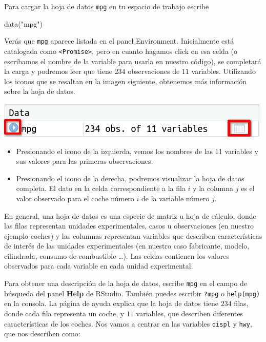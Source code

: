 \documentclass[
  title=normal,
  notoc,
  bib=normal]{mnye}
\newenvironment{Shaded}{\begin{snugshade}}{\end{snugshade}}
\newcommand{\FunctionTok}[1]{\textcolor[rgb]{0.00,0.00,0.00}{#1}}
\newcommand{\NormalTok}[1]{#1}
\newcommand{\StringTok}[1]{\textcolor[rgb]{0.31,0.60,0.02}{#1}}
\begin{document}
Para cargar la hoja de datos \texttt{mpg} en tu espacio de trabajo escribe

\begin{Shaded}
\begin{Highlighting}[]
\FunctionTok{data}\NormalTok{(}\StringTok{"mpg"}\NormalTok{)}
\end{Highlighting}
\end{Shaded}

Verás que \texttt{mpg} aparece listada en el panel Environment. Inicialmente está catalogada como \texttt{\textless{}Promise\textgreater{}}, pero en cuanto hagamos click en esa celda (o escribamos el nombre de la variable para usarla en nuestro código), se completará la carga y podremos leer que tiene \(234\) observaciones de \(11\) variables. Utilizando los iconos que se resaltan en la imagen siguiente, obtenemos más información sobre la hoja de datos.

\begin{center}\includegraphics[width=0.6\linewidth]{images/df} \end{center}

\begin{itemize}
\item
  Presionando el icono de la izquierda, vemos los nombres de las 11 variables y sus valores para las primeras observaciones.
\item
  Presionando el icono de la derecha, podremos visualizar la hoja de datos completa. El dato en la celda correspondiente a la fila \(i\) y la columna \(j\) es el valor observado para el coche número \(i\) de la variable número \(j\).
\end{itemize}

En general, una hoja de datos es una especie de matriz u hoja de cálculo, donde las filas representan unidades experimentales, casos u observaciones (en nuestro ejemplo coches) y las columnas representan variables que describen características de interés de las unidades experimentales (en nuestro caso fabricante, modelo, cilindrada, consumo de combustible \ldots). Las celdas contienen los valores observados para cada variable en cada unidad experimental.

Para obtener una descripción de la hoja de datos, escribe \texttt{mpg} en el campo de búsqueda del panel \textbf{Help} de \textsf{RStudio}. También puedes escribir \texttt{?mpg} o \texttt{help(mpg)} en la consola. La página de ayuda explica que la hoja de datos tiene \(234\) filas, donde cada fila representa un coche, y \(11\) variables, que describen diferentes características de los coches. Nos vamos a centrar en las variables \texttt{displ} y \texttt{hwy}, que nos describen como:
\end{document}
